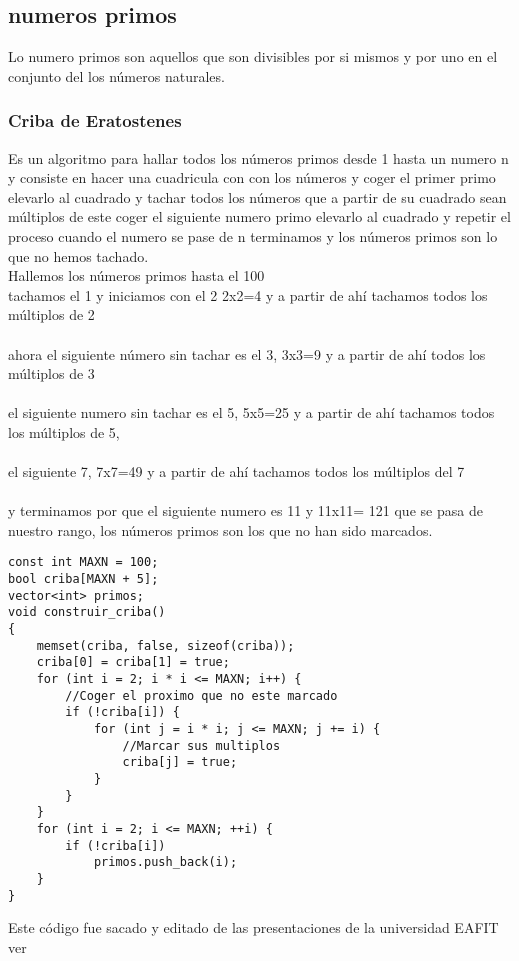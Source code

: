 \subsection{numeros primos}
Lo numero primos son aquellos que son divisibles por si mismos y por uno en el conjunto del los números naturales.

\subsubsection{Criba de Eratostenes}
Es un algoritmo para hallar todos los números primos desde 1 hasta un numero n y consiste en hacer una cuadricula con
con los números y coger el primer primo elevarlo al cuadrado y tachar todos los números que a partir de su cuadrado sean
 múltiplos de este coger el siguiente numero  primo elevarlo al cuadrado y repetir el proceso cuando el numero se pase de n terminamos
y los números primos son lo que no hemos tachado.
\\Hallemos los números primos hasta el 100
\\tachamos el 1 y iniciamos con el 2 2x2=4 y a partir de ahí tachamos todos los múltiplos de 2
\\
\\ahora el siguiente número sin tachar es el 3, 3x3=9 y a partir de ahí todos los múltiplos de 3
\\
\\el siguiente numero sin tachar es el 5, 5x5=25 y a partir de ahí tachamos todos los múltiplos de 5,
\\
\\el siguiente 7, 7x7=49 y a partir de ahí tachamos todos los múltiplos del 7
\\
\\y terminamos por que el siguiente numero es 11 y 11x11= 121 que se pasa de nuestro rango, los números primos son los que no han sido marcados.
\begin{lstlisting}[style=C,caption=criba.cpp]
const int MAXN = 100;
bool criba[MAXN + 5];
vector<int> primos;
void construir_criba()
{
    memset(criba, false, sizeof(criba));
    criba[0] = criba[1] = true;
    for (int i = 2; i * i <= MAXN; i++) {
        //Coger el proximo que no este marcado
        if (!criba[i]) {
            for (int j = i * i; j <= MAXN; j += i) {
                //Marcar sus multiplos
                criba[j] = true;
            }
        }
    }
    for (int i = 2; i <= MAXN; ++i) {
        if (!criba[i])
            primos.push_back(i);
    }
}
\end{lstlisting}
Este código fue sacado y editado de las presentaciones de la universidad EAFIT ver \cite{SemilleroProgramacion:Online}
